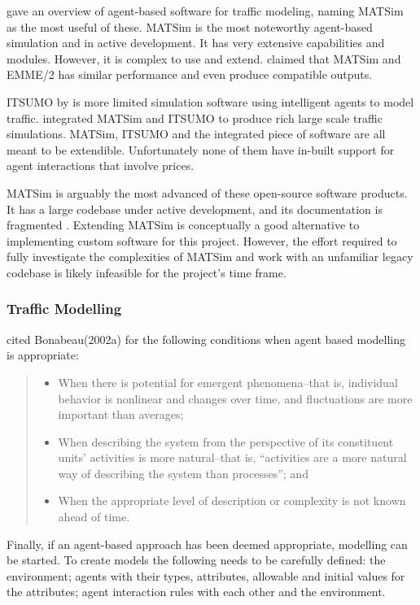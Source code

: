 \textcite{Bernhardt2007taxi+agent} gave an overview of agent-based software for
traffic modeling, naming MATSim as the most useful of these. MATSim is the most
noteworthy agent-based simulation and in active development. It has very
extensive capabilities and modules. However, it is complex to use and extend.
\textcite{Gao2010taxi+comparison} claimed that MATSim and EMME/2 has similar
performance and even produce compatible outputs.

ITSUMO by \textcite{Silva2006itsumo} is more limited simulation software using
intelligent agents to model traffic. \textcite{Bazzan2009integrating}
integrated  MATSim and ITSUMO to produce rich large scale traffic simulations.
MATSim, ITSUMO and the integrated piece of software are all meant to be
extendible. Unfortunately none of them have in-built support for agent
interactions that involve prices.

MATSim is arguably the most advanced of these open-source software products. It
has a large codebase under active development, and its documentation is
fragmented \textcite{Matsim2012}. Extending MATSim is conceptually a good
alternative to implementing custom software for this project. However, the
effort required to fully investigate the complexities of MATSim and work with
an unfamiliar legacy codebase is likely infeasible for the project's time
frame.


\subsubsection{Traffic Modelling}

\textcite[78]{Bernhardt2007taxi+agent} cited Bonabeau(2002a) for the following
conditions when agent based modelling is appropriate:

\begin{quote}
\begin{itemize}
  \item When there is potential for emergent phenomena--that is, individual 
  behavior is nonlinear and changes over time, and fluctuations are more 
  important than averages;
  \item When describing the system from the perspective of its constituent 
  units’ activities is more natural--that is, “activities are a more natural way
  of describing the system than processes”; and
  \item When the appropriate level of description or complexity is not known 
  ahead of time.
\end{itemize}
\end{quote}

Finally, if an agent-based approach has been deemed appropriate, modelling can
be started. To create models the following needs to be carefully defined: the
environment; agents with their types, attributes, allowable and initial values
for the attributes; agent interaction rules with each other and the
environment. \parencite{Bernhardt2007taxi+agent}
